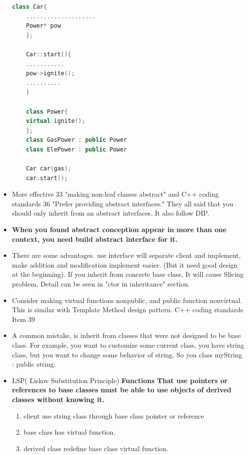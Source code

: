 \documentclass[a4paper,12pt,twoside]{book}
\begin{document}
\begin{itemize}
	\begin{lstlisting}[frame=single, language=c++]
	class Car{
	....................
	Power* pow
	};
	
	Car::start(){
	...........
	pow->ignite();
	..........
	}
	
	class Power{
	virtual ignite();
	};
	class GasPower : public Power
	class ElePower : public Power
	
	Car car(gas);
	car.start();
	\end{lstlisting}
	
	\item More effective 33 "making non-leaf classes abstract" and C++ coding standards 36 "Prefer providing abstract interfaces."	 They all said that you should only inherit from an abstract interfaces. It also follow DIP.
	
	\item \textbf{When you found abstract conception appear in more than one context, you need build abstract interface for it. }
	
	\item There are some advantages. use interface will separate client and implement, make addition and modification implement easier. (But it need good design at the beginning). If you inherit from concrete base class, It will cause Slicing problem, Detail can be seen in "ctor in inheritance" section.
	
	\item Consider making virtual functions nonpublic, and public function nonvirtual. This is similar with Template Method design pattern.  C++ coding standards Item 39
	
	
	\item  A common mistake, is inherit from classes that were not designed to be base class. For example, you want to customize some current class, you have string class, but you want to change some behavior of string. So you class myString : public string.
	
	\item LSP( Liskov Substitution Principle) \textbf{Functions That use pointers or references to base classes must be able to use objects of derived classes without knowing it. }
	\begin{enumerate}
		\item client use string class through base class pointer or reference
		\item base class has virtual function.
		\item derived class redefine base class virtual function.
	\end{enumerate}
	

\end{itemize}
\end{document}
